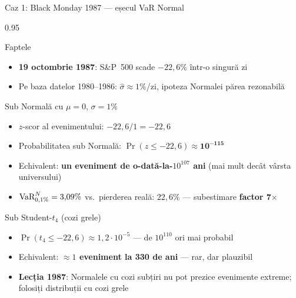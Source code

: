 \documentclass[9pt, aspectratio=169, t]{beamer}
\begin{document}
\begin{frame}[shrink=10]{Caz 1: Black Monday 1987 --- eșecul VaR Normal}
    \begin{cminipage}{0.95\textwidth}
    \begin{block}{Faptele}
    \begin{itemize}\setlength{\itemsep}{0pt}
        \item \textbf{19 octombrie 1987}: S\&P~500 scade $-22{,}6\%$ într-o singură zi
        \item Pe baza datelor 1980--1986: $\hat{\sigma} \approx 1\%$/zi, ipoteza Normalei părea rezonabilă
    \end{itemize}
    \end{block}
    \vspace{0.1cm}
    \begin{exampleblock}{Sub Normală cu $\mu = 0$, $\sigma = 1\%$}
    \begin{itemize}\setlength{\itemsep}{0pt}
        \item $z$-scor al evenimentului: $-22{,}6 / 1 = -22{,}6$
        \item Probabilitatea sub Normală: $\Pr(z \leq -22{,}6) \approx \mathbf{10^{-115}}$
        \item Echivalent: \textbf{un eveniment de o-dată-la-$10^{107}$ ani} (mai mult decât vârsta universului)
        \item $\text{VaR}^{N}_{0{,}1\%} = 3{,}09\%$ vs.\ pierderea reală: $22{,}6\%$ --- subestimare \textbf{factor 7$\times$}
    \end{itemize}
    \end{exampleblock}
    \vspace{0.1cm}
    \begin{alertblock}{Sub Student-$t_4$ (cozi grele)}
    \begin{itemize}\setlength{\itemsep}{0pt}
        \item $\Pr(t_4 \leq -22{,}6) \approx 1{,}2 \cdot 10^{-5}$ --- de $10^{110}$ ori mai probabil
        \item Echivalent: \textbf{$\approx 1$ eveniment la 330 de ani} --- rar, dar plauzibil
        \item \textbf{Lecția 1987}: Normalele cu cozi subțiri nu pot prezice evenimente extreme; folosiți distribuții cu cozi grele
    \end{itemize}
    \end{alertblock}
    \end{cminipage}
\end{frame}
\end{document}
